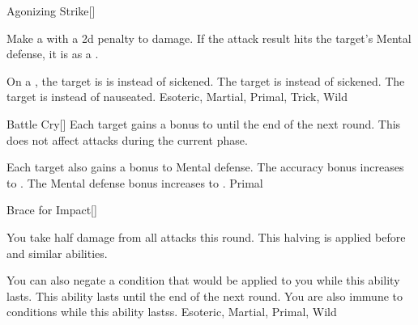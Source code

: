 
\lowercase{\hypertarget{maneuver:Agonizing Strike}{}}\label{maneuver:Agonizing Strike}
\hypertarget{maneuver:Agonizing Strike}{}
\begin{freeability}[Rank 1]{Agonizing Strike}[]

Make a  with a \minus2d penalty to damage.
If the attack result hits the target's Mental defense,
it is  as a .

\rankline
{} On a , the target is is  instead of sickened.
 The target is  instead of sickened.
 The target is  instead of nauseated.
 Esoteric, Martial, Primal, Trick, Wild
\end{freeability}
\vspace{0.25em}



\lowercase{\hypertarget{maneuver:Battle Cry}{}}\label{maneuver:Battle Cry}
\hypertarget{maneuver:Battle Cry}{}
\begin{freeability}[Rank 1]{Battle Cry}[]
Each target gains a  bonus to  until the end of the next round.
This does not affect attacks during the current phase.

\rankline
{} Each target also gains a  bonus to Mental defense.
 The accuracy bonus increases to .
 The Mental defense bonus increases to .
 Primal
\end{freeability}
\vspace{0.25em}



\lowercase{\hypertarget{maneuver:Brace for Impact}{}}\label{maneuver:Brace for Impact}
\hypertarget{maneuver:Brace for Impact}{}
\begin{freeability}[Rank 1]{Brace for Impact}[]

You take half damage from all attacks this round.
This halving is applied before  and similar abilities.

\rankline
{} You can also negate a condition that would be applied to you while this ability lasts.
 This ability lasts until the end of the next round.
 You are also immune to conditions while this ability lastss.
 Esoteric, Martial, Primal, Wild
\end{freeability}
\vspace{0.25em}



